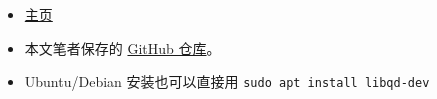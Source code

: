 
\begin{issues}
\issueDraft
\end{issues}

\begin{itemize}
\item \href{https://www.davidhbailey.com/dhbsoftware/}{主页}
\item 本文笔者保存的 \href{https://github.com/MacroUniverse/QD-test}{GitHub 仓库}。
\item Ubuntu/Debian 安装也可以直接用 \verb|sudo apt install libqd-dev|
\end{itemize}
